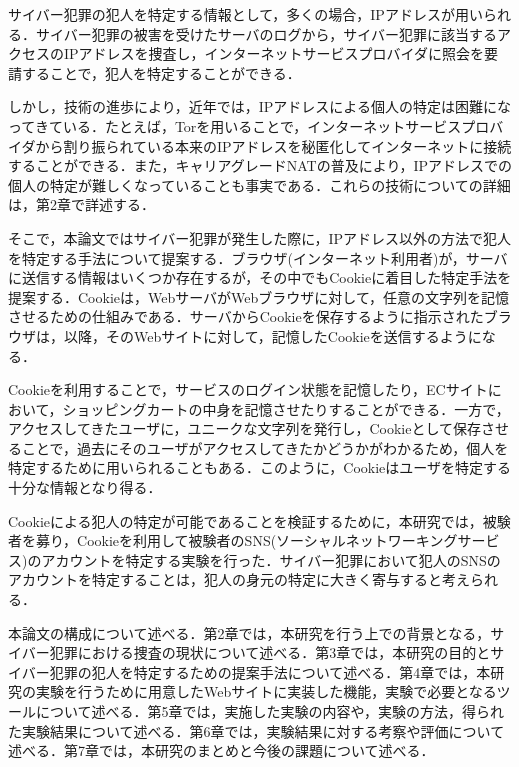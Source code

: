 \documentclass[10pt, a4paper]{jreport}
\begin{document}
サイバー犯罪の犯人を特定する情報として，多くの場合，IPアドレスが用いられる．サイバー犯罪の被害を受けたサーバのログから，サイバー犯罪に該当するアクセスのIPアドレスを捜査し，インターネットサービスプロバイダに照会を要請することで，犯人を特定することができる．

しかし，技術の進歩により，近年では，IPアドレスによる個人の特定は困難になってきている．たとえば，Torを用いることで，インターネットサービスプロバイダから割り振られている本来のIPアドレスを秘匿化してインターネットに接続することができる．また，キャリアグレードNATの普及により，IPアドレスでの個人の特定が難しくなっていることも事実である．これらの技術についての詳細は，第2章で詳述する．

そこで，本論文ではサイバー犯罪が発生した際に，IPアドレス以外の方法で犯人を特定する手法について提案する．ブラウザ(インターネット利用者)が，サーバに送信する情報はいくつか存在するが，その中でもCookieに着目した特定手法を提案する．Cookieは，WebサーバがWebブラウザに対して，任意の文字列を記憶させるための仕組みである．サーバからCookieを保存するように指示されたブラウザは，以降，そのWebサイトに対して，記憶したCookieを送信するようになる．

Cookieを利用することで，サービスのログイン状態を記憶したり，ECサイトにおいて，ショッピングカートの中身を記憶させたりすることができる．一方で，アクセスしてきたユーザに，ユニークな文字列を発行し，Cookieとして保存させることで，過去にそのユーザがアクセスしてきたかどうかがわかるため，個人を特定するために用いられることもある．このように，Cookieはユーザを特定する十分な情報となり得る．

Cookieによる犯人の特定が可能であることを検証するために，本研究では，被験者を募り，Cookieを利用して被験者のSNS(ソーシャルネットワーキングサービス)のアカウントを特定する実験を行った．サイバー犯罪において犯人のSNSのアカウントを特定することは，犯人の身元の特定に大きく寄与すると考えられる．

本論文の構成について述べる．第2章では，本研究を行う上での背景となる，サイバー犯罪における捜査の現状について述べる．第3章では，本研究の目的とサイバー犯罪の犯人を特定するための提案手法について述べる．第4章では，本研究の実験を行うために用意したWebサイトに実装した機能，実験で必要となるツールについて述べる．第5章では，実施した実験の内容や，実験の方法，得られた実験結果について述べる．第6章では，実験結果に対する考察や評価について述べる．第7章では，本研究のまとめと今後の課題について述べる．
\end{document}

